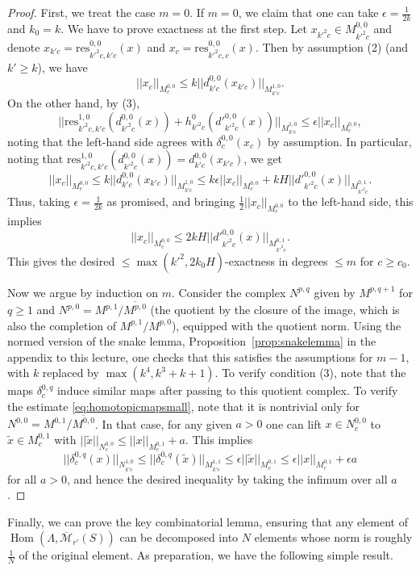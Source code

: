 \documentclass[11pt]{amsbook}
\DeclareMathOperator{\Hom}{Hom}
\renewcommand*{\tilde}{\widetilde}
\numberwithin{equation}{section}
\numberwithin{theorem}{section}
\theoremstyle{definition}
\begin{document}
\begin{proof} First, we treat the case $m=0$. If $m=0$, we claim that one can take $\epsilon=\tfrac 1{2k}$ and $k_0=k$. We have to prove exactness at the first step. Let $x_{k'^2c}\in M^{0,0}_{k'^2c}$ and denote $x_{k'c}=\mathrm{res}_{k'^2c,k'c}^{0,0}(x)$ and $x_c=\mathrm{res}_{k'^2c,c}^{0,0}(x)$. Then by assumption (2) (and $k'\geq k$), we have
\[
||x_c||_{M^{0,0}_c}\leq k||d^{0,0}_{k'c}(x_{k'c})||_{M^{1,0}_{k'c}}.
\]
On the other hand, by (3),
\[
||\mathrm{res}_{k'^2c,k'c}^{1,0}(d^{0,0}_{k'^2c}(x))+ h^0_{k'^2c}(d'^{0,0}_{k'^2c}(x))||_{M^{1,0}_{k'c}}\leq \epsilon ||x_c||_{M^{0,0}_c},
\]
noting that the left-hand side agrees with $\delta^{0,0}_c(x_c)$ by assumption. In particular, noting that $\mathrm{res}_{k'^2c,k'c}^{1,0}(d^{0,0}_{k'^2c}(x)) = d^{0,0}_{k'c}(x_{k'c})$, we get
\[
||x_c||_{M^{0,0}_c}\leq k||d^{0,0}_{k'c}(x_{k'c})||_{M^{1,0}_{k'c}}\leq k\epsilon ||x_c||_{M^{0,0}_c} + kH ||d'^{0,0}_{k'^2c}(x)||_{M^{0,1}_{k'^2c}}.
\]
Thus, taking $\epsilon=\tfrac 1{2k}$ as promised, and bringing $\tfrac 12||x_c||_{M^{0,0}_c}$ to the left-hand side, this implies
\[
||x_c||_{M^{0,0}_c}\leq 2kH ||d'^{0,0}_{k'^2c}(x)||_{M^{0,1}_{k'^2c}}.
\]
This gives the desired $\leq \max(k'^2,2k_0H)$-exactness in degrees $\leq m$ for $c\geq c_0$.

Now we argue by induction on $m$. Consider the complex $N^{p,q}$ given by $M^{p,q+1}$ for $q\geq 1$ and $N^{p,0} = M^{p,1}/\overline{M^{p,0}}$ (the quotient by the closure of the image, which is also the completion of $M^{p,1}/M^{p,0}$), equipped with the quotient norm. Using the normed version of the snake lemma, Proposition~\ref{prop:snakelemma} in the appendix to this lecture, one checks that this satisfies the assumptions for $m-1$, with $k$ replaced by $\max(k^4,k^3+k+1)$. To verify condition (3), note that the maps $\delta^{0,q}_c$ induce similar maps after passing to this quotient complex. To verify the estimate \eqref{eq:homotopicmapsmall}, note that it is nontrivial only for $N^{0,0} = M^{0,1}/\overline{M^{0,0}}$. In that case, for any given $a>0$ one can lift $x\in N^{0,0}_c$ to $\tilde{x}\in M^{0,1}_c$ with $||\tilde{x}||_{N^{0,0}_c}\leq ||x||_{M^{0,1}_c}+a$. This implies
\[
||\delta^{0,q}_c(x)||_{N^{1,0}_{k'c}}\leq ||\delta^{0,q}_c(\tilde{x})||_{M^{1,1}_{k'c}}\leq \epsilon ||\tilde{x}||_{M^{0,1}_c}\leq \epsilon ||x||_{M^{0,1}_c} + \epsilon a
\]
for all $a>0$, and hence the desired inequality by taking the infimum over all $a$.
\end{proof}

Finally, we can prove the key combinatorial lemma, ensuring that any element of $\Hom(\Lambda,\overline{\mathcal M}_{r'}(S))$ can be decomposed into $N$ elements whose norm is roughly $\tfrac 1N$ of the original element. As preparation, we have the following simple result.
\end{document}
